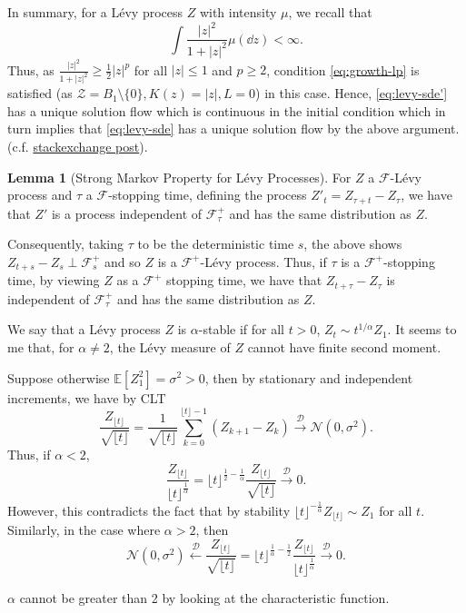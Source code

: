 \documentclass[]{article}
\theoremstyle{definition}
\theoremstyle{definition}
\newtheorem*{lemma*}{Lemma}
\begin{document}
In summary, for a L\'evy process \(Z\) with intensity \(\mu\), we recall that 
\[\int \frac{|z|^2}{1 + |z|^2} \mu(\dd z) < \infty.\]
Thus, as \(\frac{|z|^2}{1 + |z|^2} \ge \frac{1}{2}|z|^p\) for all \(|z| \le 1\) and \(p \ge 2\), 
condition \eqref{eq:growth-lp} is satisfied (as \(\mathcal{Z} = B_1\setminus\{0\}, K(z) = |z|, L = 0\)) in this case. 
Hence, \eqref{eq:levy-sde'} has a unique solution flow which is continuous in the initial condition 
which in turn implies that \eqref{eq:levy-sde} has a unique solution flow by the above argument.
(c.f. \href{https://math.stackexchange.com/questions/1878668/if-x-is-a-l%c3%a9vy-process-w-r-t-the-natural-filtration-mathcalf-is-it-so-w?rq=1}{stackexchange post}).

\begin{lemma*}[Strong Markov Property for L\'evy Processes]
  For \(Z\) a \(\mathcal{F}\)-L\'evy process and \(\tau\) a \(\mathcal{F}\)-stopping time, defining 
  the process \(Z'_t = Z_{\tau + t} - Z_\tau\), we have that \(Z'\) is a process independent of 
  \(\mathcal{F}_\tau^+\) and has the same distribution as \(Z\). 
\end{lemma*}

Consequently, taking \(\tau\) to be the deterministic time \(s\), the above shows \(Z_{t + s} - Z_{s} \perp \mathcal{F}_s^+\) 
and so \(Z\) is a \(\mathcal{F}^+\)-L\'evy process. Thus, if \(\tau\) is a \(\mathcal{F}^+\)-stopping time, 
by viewing \(Z\) as a \(\mathcal{F}^+\) stopping time, we have that \(Z_{t + \tau} - Z_{\tau}\) is independent
of \(\mathcal{F}_\tau^+\) and has the same distribution as \(Z\).

We say that a L\'evy process \(Z\) is \(\alpha\)-stable if for all \(t > 0\), \(Z_t \sim t^{1/\alpha}Z_1\). 
It seems to me that, for \(\alpha \neq 2\), the L\'evy measure of \(Z\) cannot have finite second moment. 

Suppose otherwise \(\mathbb{E}[Z_1^2] = \sigma^2 > 0\), then by stationary and independent increments, we have by CLT 
\[\frac{Z_{\lfloor t\rfloor}}{\sqrt{\lfloor t\rfloor}} = 
  \frac{1}{\sqrt{\lfloor t\rfloor}} \sum_{k = 0}^{\lfloor t\rfloor - 1} (Z_{k + 1} - Z_k) 
  \xrightarrow{\mathcal{D}} \mathcal{N}(0, \sigma^2).\]
Thus, if \(\alpha < 2\),
\[\frac{Z_{\lfloor t\rfloor}}{{\lfloor t\rfloor}^{\frac{1}{\alpha}}} =
  \lfloor t\rfloor^{\frac{1}{2} - \frac{1}{\alpha}}\frac{Z_{\lfloor t\rfloor}}{\sqrt{\lfloor t\rfloor}} 
  \xrightarrow{\mathcal{D}} 0.\]
However, this contradicts the fact that by stability \(\lfloor t\rfloor^{-\frac{1}{\alpha}}Z_{\lfloor t\rfloor} \sim Z_1\)
for all \(t\). Similarly, in the case where \(\alpha > 2\), then 
\[\mathcal{N}(0, \sigma^2) \xleftarrow{\mathcal{D}} \frac{Z_{\lfloor t\rfloor}}{\sqrt{\lfloor t\rfloor}} 
 = \lfloor t\rfloor^{\frac{1}{\alpha} - \frac{1}{2}}\frac{Z_{\lfloor t\rfloor}}{{\lfloor t\rfloor}^{\frac{1}{\alpha}}}
 \xrightarrow{\mathcal{D}} 0.\]

 \(\alpha\) cannot be greater than 2 by looking at the characteristic function.
\end{document}
